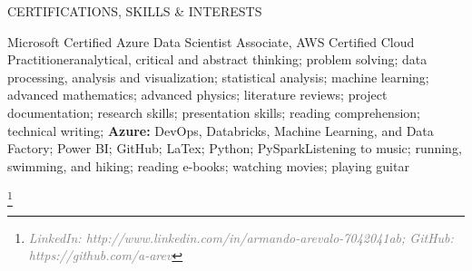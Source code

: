 \documentclass{resume}
\begin{document}
\begin{Section}{CERTIFICATIONS, SKILLS \& INTERESTS}

\begin{csiSection}{Microsoft Certified Azure Data Scientist Associate, AWS Certified Cloud Practitioner}{analytical, critical and abstract thinking; problem solving; data processing, analysis and visualization; statistical analysis; machine learning; advanced mathematics; advanced physics; literature reviews; project documentation; research skills; presentation skills; reading comprehension; technical writing; \textbf{Azure:} DevOps, Databricks, Machine Learning, and Data Factory; Power BI; GitHub; LaTex; Python; PySpark}{Listening to music; running, swimming, and hiking; reading e-books; watching movies; playing guitar}
\end{csiSection}

\end{Section}


\hfil \footnote{\footnotesize \textcolor{gray}{\textit{LinkedIn: http://www.linkedin.com/in/armando-arevalo-7042041ab; GitHub: https://github.com/a-arev}}} \hfil

\end{document}
